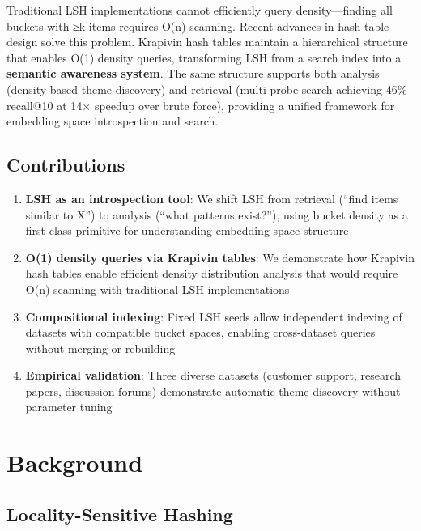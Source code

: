 \documentclass[
]{article}
\providecommand{\tightlist}{%
  \setlength{\itemsep}{0pt}\setlength{\parskip}{0pt}}
\begin{document}
Traditional LSH implementations cannot efficiently query
density---finding all buckets with ≥k items requires O(n) scanning.
Recent advances in hash table design \autocite{krapivin2025optimal}
solve this problem. Krapivin hash tables maintain a hierarchical
structure that enables O(1) density queries, transforming LSH from a
search index into a \textbf{semantic awareness system}. The same
structure supports both analysis (density-based theme discovery) and
retrieval (multi-probe search \autocite{lv2007multiprobe} achieving 46\%
recall@10 at 14× speedup over brute force), providing a unified
framework for embedding space introspection and search.

\subsection{Contributions}\label{contributions}

\begin{enumerate}
\def\labelenumi{\arabic{enumi}.}
\tightlist
\item
  \textbf{LSH as an introspection tool}: We shift LSH from retrieval
  (``find items similar to X'') to analysis (``what patterns exist?''),
  using bucket density as a first-class primitive for understanding
  embedding space structure
\item
  \textbf{O(1) density queries via Krapivin tables}: We demonstrate how
  Krapivin hash tables enable efficient density distribution analysis
  that would require O(n) scanning with traditional LSH implementations
\item
  \textbf{Compositional indexing}: Fixed LSH seeds allow independent
  indexing of datasets with compatible bucket spaces, enabling
  cross-dataset queries without merging or rebuilding
\item
  \textbf{Empirical validation}: Three diverse datasets (customer
  support, research papers, discussion forums) demonstrate automatic
  theme discovery without parameter tuning
\end{enumerate}

\section{Background}\label{background}

\subsection{Locality-Sensitive
Hashing}\label{locality-sensitive-hashing}
\end{document}
